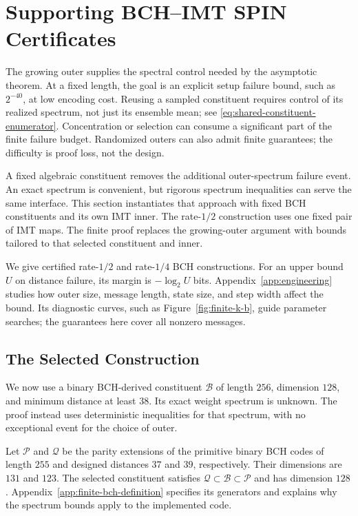 \section{Supporting BCH--IMT SPIN Certificates}
\label{sec:finite-certificates}

The growing outer supplies the spectral control needed by the asymptotic
theorem. At a fixed length, the goal is an explicit setup failure bound,
such as $2^{-40}$, at low encoding cost.
Reusing a sampled constituent requires control of its realized spectrum,
not just its ensemble mean; see \eqref{eq:shared-constituent-enumerator}.
Concentration or selection can consume a significant part of the finite
failure budget. Randomized outers can also admit finite guarantees; the
difficulty is proof loss, not the design.

A fixed algebraic constituent removes the additional outer-spectrum failure
event. An exact spectrum is convenient, but rigorous spectrum inequalities
can serve the same interface. This section instantiates that approach
with fixed BCH constituents and its own IMT inner. The rate-$1/2$
construction uses one fixed pair of IMT maps.
The finite proof replaces the growing-outer argument with bounds tailored
to that selected constituent and inner.

We give certified rate-$1/2$ and rate-$1/4$ BCH constructions.
For an upper bound $U$ on distance failure, its margin is $-\log_2U$ bits.
Appendix~\ref{app:engineering} studies how outer size, message length,
state size, and step width affect the bound. Its diagnostic curves, such as
Figure~\ref{fig:finite-k-b}, guide
parameter searches; the guarantees here cover all nonzero messages.

\subsection{The Selected Construction}
\label{sec:finite-selected-construction}

We now use a binary BCH-derived constituent $\mathcal B$ of length $256$,
dimension $128$, and minimum distance at least $38$.
Its exact weight spectrum is unknown. The proof instead uses deterministic
inequalities for that spectrum, with no exceptional event for the choice
of outer.

Let $\mathcal P$ and $\mathcal Q$ be the parity extensions of the primitive binary BCH codes
of length $255$ and designed distances $37$ and $39$, respectively.
Their dimensions are $131$ and $123$. The selected constituent satisfies
$\mathcal Q\subset\mathcal B\subset\mathcal P$ and has dimension $128$.
Appendix~\ref{app:finite-bch-definition} specifies its generators and explains
why the spectrum bounds apply to the implemented code.

